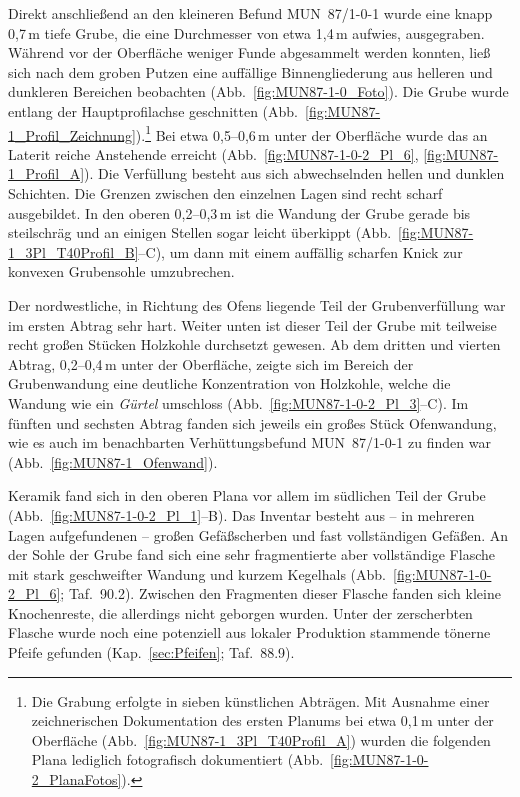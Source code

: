 Direkt anschließend an den kleineren Befund MUN~87/1-0-1 wurde eine knapp 0,7\,m tiefe Grube, die eine Durchmesser von etwa 1,4\,m aufwies, ausgegraben. Während vor der Oberfläche weniger Funde abgesammelt werden konnten, ließ sich nach dem groben Putzen eine auffällige Binnengliederung aus helleren und dunkleren Bereichen beobachten (Abb.~\ref{fig:MUN87-1-0_Foto}). Die Grube wurde entlang der Hauptprofilachse geschnitten (Abb.~\ref{fig:MUN87-1_Profil_Zeichnung}).\footnote{Die Grabung erfolgte in sieben künstlichen Abträgen. Mit Ausnahme einer zeichnerischen Dokumentation des ersten Planums bei etwa 0,1\,m unter der Oberfläche (Abb.~\ref{fig:MUN87-1_3Pl_T40Profil_A}) wurden die folgenden Plana lediglich fotografisch dokumentiert (Abb.~\ref{fig:MUN87-1-0-2_PlanaFotos}).} Bei etwa 0,5--0,6\,m unter der Oberfläche wurde das an Laterit reiche Anstehende erreicht (Abb.~\ref{fig:MUN87-1-0-2_Pl_6}, \ref{fig:MUN87-1_Profil_A}). Die Verfüllung besteht aus sich abwechselnden hellen und dunklen Schichten. Die Grenzen zwischen den einzelnen Lagen sind recht scharf ausgebildet. In den oberen 0,2--0,3\,m ist die Wandung der Grube gerade bis steilschräg und an einigen Stellen sogar leicht überkippt (Abb.~\ref{fig:MUN87-1_3Pl_T40Profil_B}--C), um dann mit einem auffällig scharfen Knick zur konvexen Grubensohle umzubrechen.

Der nordwestliche, in Richtung des Ofens liegende Teil der Grubenverfüllung war im ersten Abtrag sehr hart. Weiter unten ist dieser Teil der Grube mit teilweise recht großen Stücken Holzkohle durchsetzt gewesen. Ab dem dritten und vierten Abtrag, 0,2--0,4\,m unter der Oberfläche, zeigte sich im Bereich der Grubenwandung eine deutliche Konzentration von Holzkohle, welche die Wandung wie ein \textit{Gürtel} umschloss (Abb.~\ref{fig:MUN87-1-0-2_Pl_3}--C). Im fünften und sechsten Abtrag fanden sich jeweils ein großes Stück Ofenwandung, wie es auch im benachbarten Verhüttungsbefund MUN~87/1-0-1 zu finden war (Abb.~\ref{fig:MUN87-1_Ofenwand}).

Keramik fand sich in den oberen Plana vor allem im südlichen Teil der Grube (Abb.~\ref{fig:MUN87-1-0-2_Pl_1}--B). Das Inventar besteht aus -- in mehreren Lagen aufgefundenen -- großen Gefäßscherben und fast vollständigen Gefäßen. An der Sohle der Grube fand sich eine sehr fragmentierte aber vollständige Flasche mit stark geschweifter Wandung und kurzem Kegelhals (Abb.~\ref{fig:MUN87-1-0-2_Pl_6}; Taf.~90.2). Zwischen den Fragmenten dieser Flasche fanden sich kleine Knochenreste, die allerdings nicht geborgen wurden. Unter der zerscherbten Flasche wurde noch eine potenziell aus lokaler Produktion stammende tönerne Pfeife gefunden (Kap.~\ref{sec:Pfeifen}; Taf.~88.9). 

